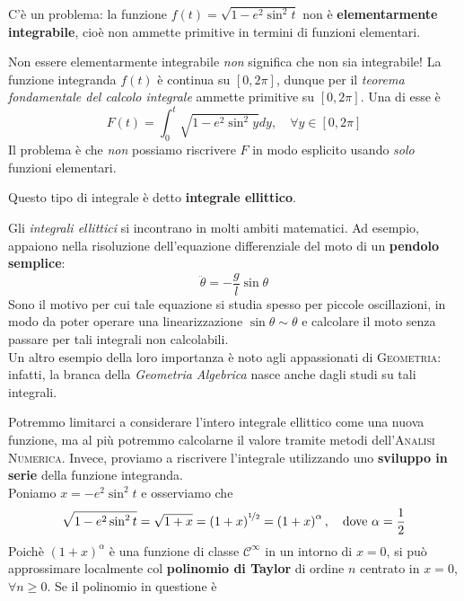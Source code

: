 C'è un problema: la funzione $f\left(t\right)=\sqrt{1-e^2\sin^2t}$ non è \textbf{elementarmente integrabile}, cioè non ammette primitive in termini di funzioni elementari.
\begin{attention}
	Non essere elementarmente integrabile \textit{non} significa che non sia integrabile! La funzione integranda $f\left(t\right)$ è continua su $\left[0, 2\pi\right]$, dunque per il \textit{teorema fondamentale del calcolo integrale} ammette primitive su $\left[0, 2\pi\right]$. Una di esse è
	\begin{equation*}
		F\left(t\right)=\int_{0}^{t}\sqrt{1-e^2\sin^2y}dy,\quad\forall y\in\left[0,2\pi\right]
 	\end{equation*}
	Il problema è che \textit{non} possiamo riscrivere $F$ in modo esplicito usando \textit{solo} funzioni elementari.
\end{attention}
\noindent Questo tipo di integrale è detto \textbf{integrale ellittico}.
\begin{digression}
	Gli \textit{integrali ellittici} si incontrano in molti ambiti matematici. Ad esempio, appaiono nella risoluzione dell'equazione differenziale del moto di un \textbf{pendolo semplice}:
	\begin{equation*}
		\ddot{\theta}=-\frac{g}{l}\sin\theta
	\end{equation*}
	Sono il motivo per cui tale equazione si studia spesso per piccole oscillazioni, in modo da poter operare una linearizzazione $\sin\theta\sim\theta$ e calcolare il moto senza passare per tali integrali non calcolabili.\\
	Un altro esempio della loro importanza è noto agli appassionati di \textsc{Geometria}: infatti, la branca della \textit{Geometria Algebrica} nasce anche dagli studi su tali integrali.
\end{digression}
Potremmo limitarci a considerare l'intero integrale ellittico come una nuova funzione, ma al più potremmo calcolarne il valore tramite metodi dell'\textsc{Analisi Numerica}. Invece, proviamo a riscrivere l'integrale utilizzando uno \textbf{sviluppo in serie} della funzione integranda.\\
Poniamo $x=-e^2\sin^2t$ e osserviamo che
\begin{equation*}
	\sqrt{1-e^2\sin^2 t}=\sqrt{1+x}=\left(1+x\right)^{\nicefrac{1}{2}}=\left(1+x\right)^\alpha,\quad\text{dove}\ \alpha=\frac{1}{2}
\end{equation*}
Poichè $\left(1+x\right)^\alpha$ è una funzione di classe $\mathcal{C}^\infty$ in un intorno di $x=0$, si può approssimare localmente col \textbf{polinomio di Taylor} di ordine $n$ centrato in $x=0$, $\forall n\geq 0$. Se il polinomio in questione è
